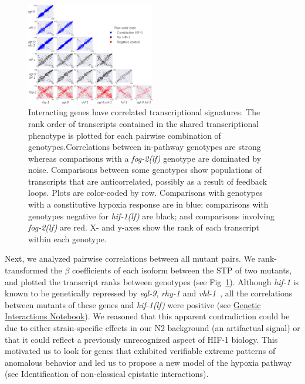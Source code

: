 \documentclass[9pt,twocolumn,twoside]{pnas-new}
\newcommand{\gene}[1]{\mbox{\emph{#1}}}
\newcommand{\fog}{\gene{fog-2(lf)}}
\newcommand{\hif}{\gene{hif-1(lf)}}
\newcommand{\hifp}{HIF-1}
\begin{document}
\begin{figure}[tbhp]
  \centering
  \includegraphics[width=0.5\textwidth]{../final_figs/triangle_plot.pdf}
  \caption{
  Interacting genes have correlated transcriptional signatures. The rank order
  of transcripts contained in the shared transcriptional phenotype is plotted
  for each pairwise combination of genotypes.Correlations between in-pathway
  genotypes are strong whereas comparisons with a \fog{} genotype are dominated
  by noise. Comparisons between some genotypes show populations of transcripts
  that are anticorrelated, possibly as a result of feedback loops. Plots are
  color-coded by row. Comparisons with genotypes with a constitutive hypoxia
  response are in blue; comparisons with genotypes negative for \hif{} are
  black; and comparisons involving \fog{} are red. X- and y-axes show the rank
  of each transcript within each genotype.
  }
\label{fig:genetic_interactions}
\end{figure}

Next, we analyzed pairwise correlations between all mutant pairs. We
rank-transformed the $\beta$ coefficients of each isoform between the STP of two
mutants, and plotted the transcript ranks between genotypes (see
Fig~\ref{fig:genetic_interactions}).
Although \gene{hif-1} is known to be genetically repressed by
\gene{egl-9}, \gene{rhy-1} and \gene{vhl-1}~\cite{Epstein2001,Shen2006}, all the
correlations between mutants of these genes and \hif{} were positive (see
\href{https://wormlabcaltech.github.io/mprsq/analysis_notebooks/2_predict_interactions.html}
{Genetic Interactions Notebook}). We reasoned that this apparent contradiction
could be due to either strain-specific effects in our N2 background (an
artifactual signal) or that it could reflect a previously unrecognized aspect of
\hifp{} biology. This motivated us to look for genes that exhibited verifiable
extreme patterns of anomalous behavior and led us to propose a new model of the
hypoxia pathway (see Identification of non-classical epistatic interactions).
\end{document}
